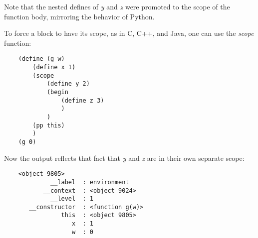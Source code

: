 Note that the nested defines of {\it y} and {\it z} were promoted
to the scope of the function body, mirroring the behavior of Python.

To force a block to have its scope, as in C, C++, and Java,
one can use the {\it scope} function:

\begin{verbatim}
    (define (g w)
        (define x 1)
        (scope
            (define y 2)
            (begin
                (define z 3)
                )
            )
        (pp this)
        )
    (g 0)
\end{verbatim}

Now the output reflects that fact that {\it y} and {\it z} are in their own
separate scope:

\begin{verbatim}
    <object 9805>
             __label  : environment
           __context  : <object 9024>
             __level  : 1
       __constructor  : <function g(w)>
                this  : <object 9805>
                   x  : 1
                   w  : 0
\end{verbatim}


